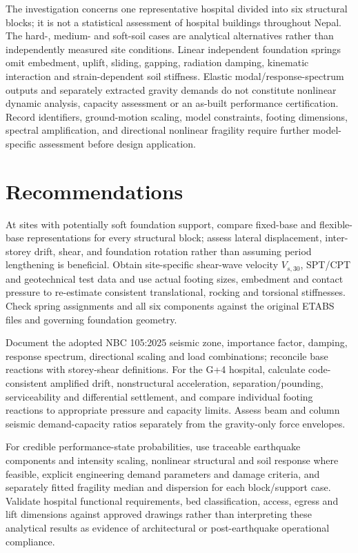 The investigation concerns one representative hospital divided into six structural blocks; it is not a statistical assessment of hospital buildings throughout Nepal. The hard-, medium- and soft-soil cases are analytical alternatives rather than independently measured site conditions. Linear independent foundation springs omit embedment, uplift, sliding, gapping, radiation damping, kinematic interaction and strain-dependent soil stiffness. Elastic modal/response-spectrum outputs and separately extracted gravity demands do not constitute nonlinear dynamic analysis, capacity assessment or an as-built performance certification. Record identifiers, ground-motion scaling, model constraints, footing dimensions, spectral amplification, and directional nonlinear fragility require further model-specific assessment before design application.

\section{Recommendations}
At sites with potentially soft foundation support, compare fixed-base and flexible-base representations for every structural block; assess lateral displacement, inter-storey drift, shear, and foundation rotation rather than assuming period lengthening is beneficial. Obtain site-specific shear-wave velocity $V_{s,30}$, SPT/CPT and geotechnical test data and use actual footing sizes, embedment and contact pressure to re-estimate consistent translational, rocking and torsional stiffnesses. Check spring assignments and all six components against the original ETABS files and governing foundation geometry.

Document the adopted NBC 105:2025 seismic zone, importance factor, damping, response spectrum, directional scaling and load combinations; reconcile base reactions with storey-shear definitions. For the G+4 hospital, calculate code-consistent amplified drift, nonstructural acceleration, separation/pounding, serviceability and differential settlement, and compare individual footing reactions to appropriate pressure and capacity limits. Assess beam and column seismic demand-capacity ratios separately from the gravity-only force envelopes.

For credible performance-state probabilities, use traceable earthquake components and intensity scaling, nonlinear structural and soil response where feasible, explicit engineering demand parameters and damage criteria, and separately fitted fragility median and dispersion for each block/support case. Validate hospital functional requirements, bed classification, access, egress and lift dimensions against approved drawings rather than interpreting these analytical results as evidence of architectural or post-earthquake operational compliance.
